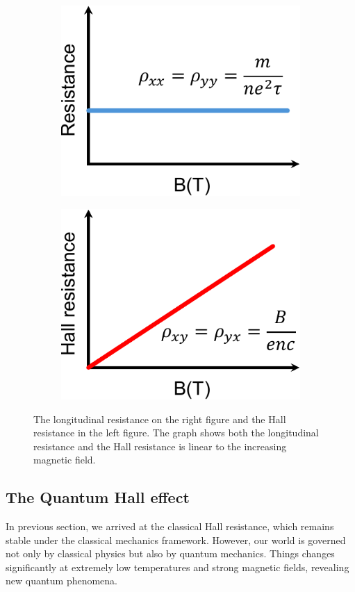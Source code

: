 \documentclass{report}
\begin{document}
\begin{figure}[htb]
	\centering
	\begin{subfigure}[b]{0.495\textwidth}
		\centering
		{\includegraphics[width=0.75\linewidth]{pic/classRess.pdf}}
	\end{subfigure}
	\begin{subfigure}[b]{0.495\textwidth}
		\centering
		\includegraphics[width=0.75\linewidth]{pic/HallRess.pdf}
	\end{subfigure}
	\caption[Logitudinal resistance and Hall resistance plot.]{
		The longitudinal resistance on the right figure and the Hall resistance in the left figure. The graph shows both the longitudinal resistance and the Hall resistance is linear to the increasing magnetic field.
	}
\end{figure}
\subsection{The Quantum Hall effect}
In previous section, we arrived at the classical Hall resistance, which remains stable under the classical mechanics framework. However, our world is governed not only by classical physics but also by quantum mechanics. Things changes significantly at extremely low temperatures and strong magnetic fields, revealing new quantum phenomena.
\end{document}
